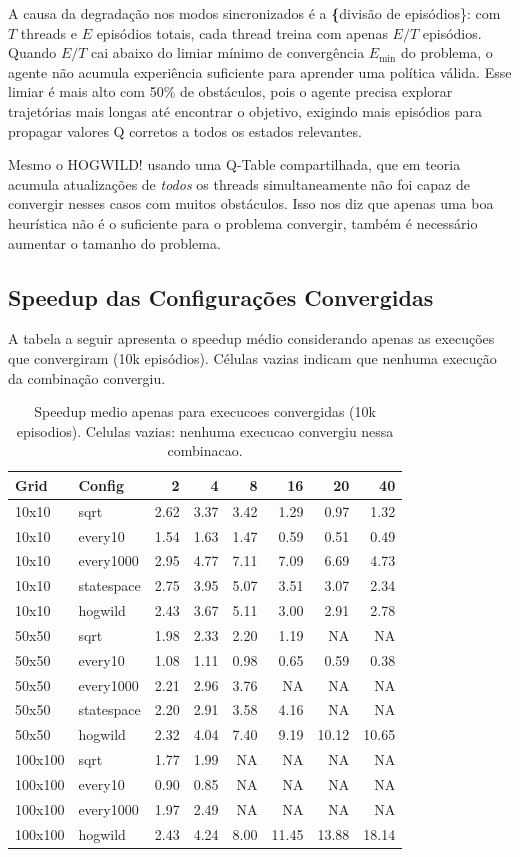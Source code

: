 \documentclass[12pt]{article}
\begin{document}
A causa da degradação nos modos sincronizados é a \textbf\{divisão de
episódios\}: com \(T\) threads e \(E\) episódios totais, cada thread treina
com apenas \(E/T\) episódios. Quando \(E/T\) cai abaixo do limiar mínimo de
convergência \(E_{\min}\) do problema, o agente não acumula experiência
suficiente para aprender uma política válida. Esse limiar é mais alto
com 50\% de obstáculos, pois o agente precisa explorar trajetórias mais
longas até encontrar o objetivo, exigindo mais episódios para propagar
valores Q corretos a todos os estados relevantes.

Mesmo o HOGWILD! usando uma Q-Table compartilhada, que em teoria
acumula atualizações de \textit{todos} os threads simultaneamente não
foi capaz de convergir nesses casos com muitos obstáculos. Isso nos
diz que apenas uma boa heurística não é o suficiente para o problema
convergir, também é necessário aumentar o tamanho do problema.
\subsection{Speedup das Configurações Convergidas}
\label{sec:orgcf56a85}

A tabela a seguir apresenta o speedup médio considerando apenas as
execuções que convergiram (10k episódios). Células vazias indicam que
nenhuma execução da combinação convergiu.

\begin{table}

\caption{Speedup medio apenas para execucoes convergidas (10k episodios). Celulas vazias: nenhuma execucao convergiu nessa combinacao.}
\centering
\begin{tabular}[t]{llrrrrrr}
\toprule
Grid & Config & 2 & 4 & 8 & 16 & 20 & 40\\
\midrule
10x10 & sqrt & 2.62 & 3.37 & 3.42 & 1.29 & 0.97 & 1.32\\
10x10 & every10 & 1.54 & 1.63 & 1.47 & 0.59 & 0.51 & 0.49\\
10x10 & every1000 & 2.95 & 4.77 & 7.11 & 7.09 & 6.69 & 4.73\\
10x10 & statespace & 2.75 & 3.95 & 5.07 & 3.51 & 3.07 & 2.34\\
10x10 & hogwild & 2.43 & 3.67 & 5.11 & 3.00 & 2.91 & 2.78\\
50x50 & sqrt & 1.98 & 2.33 & 2.20 & 1.19 & NA & NA\\
50x50 & every10 & 1.08 & 1.11 & 0.98 & 0.65 & 0.59 & 0.38\\
50x50 & every1000 & 2.21 & 2.96 & 3.76 & NA & NA & NA\\
50x50 & statespace & 2.20 & 2.91 & 3.58 & 4.16 & NA & NA\\
50x50 & hogwild & 2.32 & 4.04 & 7.40 & 9.19 & 10.12 & 10.65\\
100x100 & sqrt & 1.77 & 1.99 & NA & NA & NA & NA\\
100x100 & every10 & 0.90 & 0.85 & NA & NA & NA & NA\\
100x100 & every1000 & 1.97 & 2.49 & NA & NA & NA & NA\\
100x100 & hogwild & 2.43 & 4.24 & 8.00 & 11.45 & 13.88 & 18.14\\
\bottomrule
\end{tabular}
\end{table}
\end{document}
